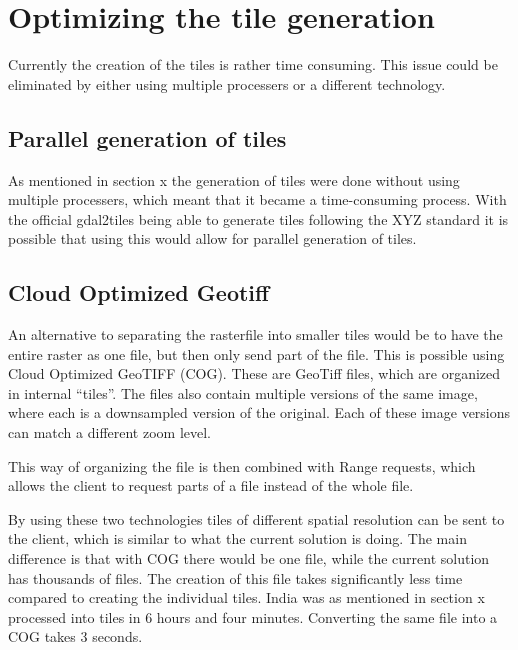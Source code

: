 \section{Optimizing the tile generation}

Currently the creation of the tiles is rather time consuming. This issue could be eliminated by either using multiple processers or a different technology.

\subsection{Parallel generation of tiles}
As mentioned in section x the generation of tiles were done without using multiple processers, which meant that it became a time-consuming process. With the official gdal2tiles being able to generate tiles following the XYZ standard it is possible that using this would allow for parallel generation of tiles. 


\subsection{Cloud Optimized Geotiff}

An alternative to separating the rasterfile into smaller tiles would be to have the entire raster as one file, but then only send part of the file. This is possible using Cloud Optimized GeoTIFF (COG). These are GeoTiff files, which are organized in internal “tiles”.
The files also contain multiple versions of the same image, where each is a downsampled version of the original. Each of these image versions can match a different zoom level.


This way of organizing the file is then combined with Range requests, which allows the client to request parts of a file instead of the whole file. \citep{COGoverview} 

By using these two technologies tiles of different spatial resolution can be sent to the client, which is similar to what the current solution is doing. The main difference is that with COG there would be one file, while the current solution has thousands of files. The creation of this file takes significantly less time compared to creating the individual tiles. India was as mentioned in section x processed into tiles in 6 hours and four minutes. Converting the same file into a COG takes 3 seconds.



